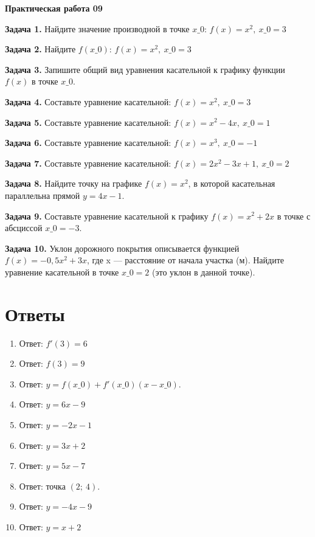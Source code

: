 \documentclass{umk-matematika}
\begin{document}
\begin{center}
{\Large\bfseries Практическая работа 09}
\end{center}
\vspace{0.5cm}

\textbf{Задача 1.} Найдите значение производной в точке $x\_0$: $f(x) = x^2,\ x\_0 = 3$\par\vspace{10pt}
\textbf{Задача 2.} Найдите $f(x\_0)$: $f(x) = x^2,\ x\_0 = 3$\par\vspace{10pt}
\textbf{Задача 3.} Запишите общий вид уравнения касательной к графику функции $f(x)$ в точке $x\_0$.\par\vspace{10pt}
\textbf{Задача 4.} Составьте уравнение касательной: $f(x) = x^2,\ x\_0 = 3$\par\vspace{10pt}
\textbf{Задача 5.} Составьте уравнение касательной: $f(x) = x^2 - 4x,\ x\_0 = 1$\par\vspace{10pt}
\textbf{Задача 6.} Составьте уравнение касательной: $f(x) = x^3,\ x\_0 = -1$\par\vspace{10pt}
\textbf{Задача 7.} Составьте уравнение касательной: $f(x) = 2x^2 - 3x + 1,\ x\_0 = 2$\par\vspace{10pt}
\textbf{Задача 8.} Найдите точку на графике $f(x) = x^2$, в которой касательная параллельна прямой $y = 4x - 1$.\par\vspace{10pt}
\textbf{Задача 9.} Составьте уравнение касательной к графику $f(x) = x^2 + 2x$ в точке с абсциссой $x\_0 = -3$.\par\vspace{10pt}
\textbf{Задача 10.} Уклон дорожного покрытия описывается функцией $f(x) = -0{,}5x^2 + 3x$, где x — расстояние от начала участка (м). Найдите уравнение касательной в точке $x\_0 = 2$ (это уклон в данной точке).\par\vspace{10pt}
\newpage
\section*{Ответы}

\begin{enumerate}
  \item Ответ: $f'(3) = 6$
  \item Ответ: $f(3) = 9$
  \item Ответ: $y = f(x\_0) + f'(x\_0)(x - x\_0)$.
  \item Ответ: $y = 6x - 9$
  \item Ответ: $y = -2x - 1$
  \item Ответ: $y = 3x + 2$
  \item Ответ: $y = 5x - 7$
  \item Ответ: точка $(2;\ 4)$.
  \item Ответ: $y = -4x - 9$
  \item Ответ: $y = x + 2$
\end{enumerate}
\end{document}
